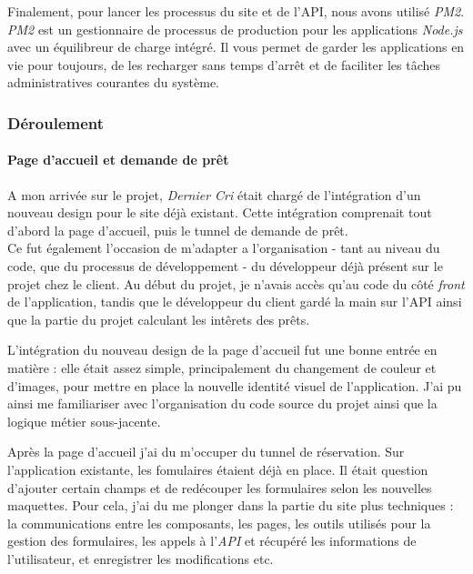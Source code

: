 \bigskip

Finalement, pour lancer les processus du site et de l'API, nous avons
utilisé \emph{PM2}. \emph{PM2} est un gestionnaire de processus de
production pour les applications \emph{Node.js} avec un équilibreur de
charge intégré. Il vous permet de garder les applications en vie pour
toujours, de les recharger sans temps d'arrêt et de faciliter les tâches
administratives courantes du système.

\bigskip

\subsubsection{Déroulement}\label{duxe9roulement-1}

\paragraph{Page d'accueil et demande de
prêt}\label{page-daccueil-et-demande-de-pruxeat}

\bigskip

A mon arrivée sur le projet, \emph{Dernier Cri} était chargé de
l'intégration d'un nouveau design pour le site déjà existant. Cette
intégration comprenait tout d'abord la page d'accueil, puis le tunnel de
demande de prêt.\\
Ce fut également l'occasion de m'adapter a l'organisation - tant au
niveau du code, que du processus de développement - du développeur déjà
présent sur le projet chez le client. Au début du projet, je n'avais
accès qu'au code du côté \emph{front} de l'application, tandis que le
développeur du client gardé la main sur l'API ainsi que la partie du
projet calculant les intêrets des prêts.

\bigskip

L'intégration du nouveau design de la page d'accueil fut une bonne
entrée en matière : elle était assez simple, principalement du
changement de couleur et d'images, pour mettre en place la nouvelle
identité visuel de l'application. J'ai pu ainsi me familiariser avec
l'organisation du code source du projet ainsi que la logique métier
sous-jacente.

\bigskip

Après la page d'accueil j'ai du m'occuper du tunnel de réservation. Sur
l'application existante, les fomulaires étaient déjà en place. Il était
question d'ajouter certain champs et de redécouper les formulaires selon
les nouvelles maquettes. Pour cela, j'ai du me plonger dans la partie du
site plus techniques : la communications entre les composants, les
pages, les outils utilisés pour la gestion des formulaires, les appels à
l'\emph{API} et récupéré les informations de l'utilisateur, et
enregistrer les modifications etc.

